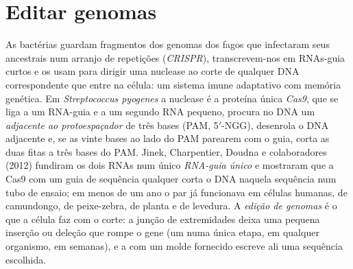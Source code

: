 \section{Editar genomas}

\begin{definition}\label{def:b3:genetic-engineering:crispr}
As bactérias guardam fragmentos dos genomas dos fagos que infectaram
seus ancestrais num arranjo de repetições (\emph{CRISPR}),
transcrevem-nos em RNAs-guia curtos e os usam para dirigir uma nuclease
ao corte de qualquer DNA correspondente que entre na célula: um sistema
imune adaptativo com memória genética. Em \emph{Streptococcus pyogenes}
a nuclease é a proteína única \emph{Cas9}, que se liga a um RNA-guia e
a um segundo RNA pequeno, procura no DNA um \emph{ adjacente ao
protoespaçador} de três bases (PAM, 5$'$-NGG), desenrola o DNA
adjacente e, se as vinte bases ao lado do PAM parearem com o guia,
corta as duas fitas a três bases do PAM. Jinek, Charpentier, Doudna e
colaboradores (2012) fundiram os dois RNAs num único \emph{RNA-guia
único} e mostraram que a Cas9 com um guia de sequência qualquer corta o
DNA naquela sequência num tubo de ensaio; em menos de um ano o par já
funcionava em células humanas, de camundongo, de peixe-zebra, de planta
e de levedura. A \emph{edição de genomas} é o que a célula faz com o
corte: a junção de extremidades deixa uma pequena inserção ou deleção
que rompe o gene (um  numa única etapa, em qualquer organismo,
em semanas), e a  com um molde fornecido escreve
ali uma sequência escolhida.
\end{definition}


